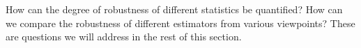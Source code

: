 \begin{stexample}
\end{stexample}

How can the degree of robustness of different statistics be quantified? How can
we compare the robustness of different estimators from various viewpoints?
These are questions we will address in the rest of this section.

